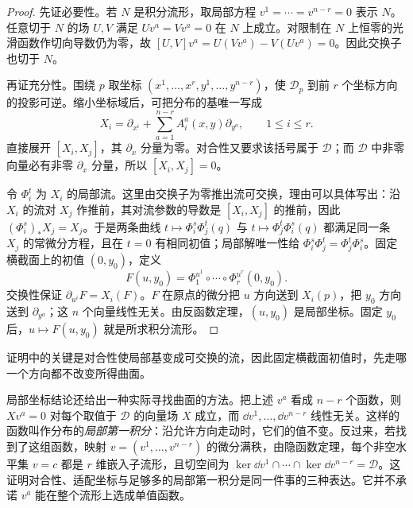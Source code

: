 \begin{proof}
先证必要性。若 \(N\) 是积分流形，取局部方程 \(v^1=\cdots=v^{n-r}=0\) 表示 \(N\)。任意切于 \(N\) 的场 \(U,V\) 满足 \(Uv^a=Vv^a=0\) 在 \(N\) 上成立。对限制在 \(N\) 上恒零的光滑函数作切向导数仍为零，故 \([U,V]v^a=U(Vv^a)-V(Uv^a)=0\)。因此交换子也切于 \(N\)。

再证充分性。围绕 \(p\) 取坐标 \((x^1,\ldots,x^r,y^1,\ldots,y^{n-r})\)，使 \(\mathcal D_p\) 到前 \(r\) 个坐标方向的投影可逆。缩小坐标域后，可把分布的基唯一写成
\[
X_i=\partial_{x^i}+\sum_{a=1}^{n-r}A_i^a(x,y)\partial_{y^a},
\qquad 1\le i\le r.
\]
直接展开 \([X_i,X_j]\)，其 \(\partial_x\) 分量为零。对合性又要求该括号属于 \(\mathcal D\)；而 \(\mathcal D\) 中非零向量必有非零 \(\partial_x\) 分量，所以 \([X_i,X_j]=0\)。

令 \(\Phi_i^t\) 为 \(X_i\) 的局部流。这里由交换子为零推出流可交换，理由可以具体写出：沿 \(X_i\) 的流对 \(X_j\) 作推前，其对流参数的导数是 \([X_i,X_j]\) 的推前，因此 \((\Phi_i^s)_*X_j=X_j\)。于是两条曲线 \(t\mapsto\Phi_i^s\Phi_j^t(q)\) 与 \(t\mapsto\Phi_j^t\Phi_i^s(q)\) 都满足同一条 \(X_j\) 的常微分方程，且在 \(t=0\) 有相同初值；局部解唯一性给 \(\Phi_i^s\Phi_j^t=\Phi_j^t\Phi_i^s\)。固定横截面上的初值 \((0,y_0)\)，定义
\[
F(u,y_0)=\Phi_1^{u^1}\circ\cdots\circ\Phi_r^{u^r}(0,y_0).
\]
交换性保证 \(\partial_{u^i}F=X_i(F)\)。\(F\) 在原点的微分把 \(u\) 方向送到 \(X_i(p)\)，把 \(y_0\) 方向送到 \(\partial_{y^a}\)；这 \(n\) 个向量线性无关。由反函数定理，\((u,y_0)\) 是局部坐标。固定 \(y_0\) 后，\(u\mapsto F(u,y_0)\) 就是所求积分流形。
\end{proof}

证明中的关键是对合性使局部基变成可交换的流，因此固定横截面初值时，先走哪一个方向都不改变所得曲面。

局部坐标结论还给出一种实际寻找曲面的方法。把上述 \(v^a\) 看成 \(n-r\) 个函数，则 \(Xv^a=0\) 对每个取值于 \(\mathcal D\) 的向量场 \(X\) 成立，而 \(\dd v^1,\ldots,\dd v^{n-r}\) 线性无关。这样的函数叫作分布的\emph{局部第一积分}：沿允许方向走动时，它们的值不变。反过来，若找到了这组函数，映射 \(v=(v^1,\ldots,v^{n-r})\) 的微分满秩，由隐函数定理，每个非空水平集 \(v=c\) 都是 \(r\) 维嵌入子流形，且切空间为
\(\ker \dd v^1\cap\cdots\cap\ker \dd v^{n-r}=\mathcal D\)。这证明对合性、适配坐标与足够多的局部第一积分是同一件事的三种表达。它并不承诺 \(v^a\) 能在整个流形上选成单值函数。


